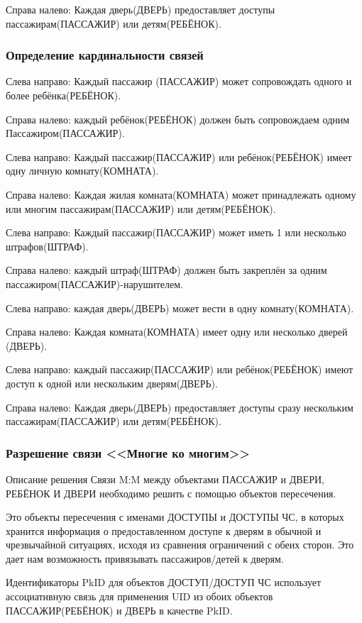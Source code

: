 Справа налево: Каждая дверь(ДВЕРЬ) предоставляет доступы пассажирам(ПАССАЖИР) или детям(РЕБЁНОК).

\subsubsection{Определение кардинальности связей}

Слева направо: Каждый пассажир (ПАССАЖИР) может сопровождать одного и более ребёнка(РЕБЁНОК).

Справа налево: каждый ребёнок(РЕБЁНОК) должен быть сопровождаем одним Пассажиром(ПАССАЖИР).

Слева направо: Каждый пассажир(ПАССАЖИР) или ребёнок(РЕБЁНОК) имеет одну личную комнату(КОМНАТА).

Справа налево: Каждая жилая комната(КОМНАТА) может принадлежать одному или многим пассажирам(ПАССАЖИР) или детям(РЕБЁНОК).

Слева направо: Каждый пассажир(ПАССАЖИР) может иметь 1 или несколько штрафов(ШТРАФ).

Справа налево: каждый штраф(ШТРАФ) должен быть закреплён за одним пассажиром(ПАССАЖИР)-нарушителем.

Слева направо: каждая дверь(ДВЕРЬ) может вести в одну комнату(КОМНАТА).

Справа налево: Каждая комната(КОМНАТА) имеет одну или несколько дверей (ДВЕРЬ).

Слева направо: каждый пассажир(ПАССАЖИР) или ребёнок(РЕБЁНОК) имеют доступ к одной или нескольким дверям(ДВЕРЬ).

Справа налево: Каждая дверь(ДВЕРЬ) предоставляет доступы сразу нескольким пассажирам(ПАССАЖИР) или детям(РЕБЁНОК).

\subsubsection{Разрешение связи <<Многие ко многим>>}

Описание решения Связи M:M между объектами ПАССАЖИР и ДВЕРИ, РЕБЁНОК И ДВЕРИ необходимо решить с помощью объектов пересечения. 

Это объекты пересечения с именами ДОСТУПЫ и ДОСТУПЫ ЧС, в которых хранится информация о предоставленном доступе к дверям в обычной и чрезвычайной ситуациях, исходя из сравнения ограничений с обеих сторон. Это дает нам возможность привязывать пассажиров/детей к дверям.
 
Идентификаторы PkID для объектов ДОСТУП/ДОСТУП ЧС использует ассоциативную связь для применения UID из обоих объектов ПАССАЖИР(РЕБЁНОК) и ДВЕРЬ в качестве PkID.

